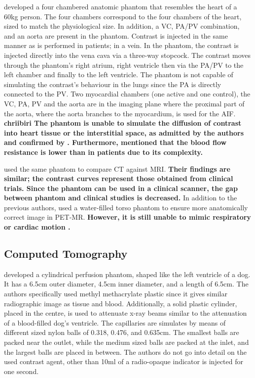 \cite{chiribiri2013perfusion} developed a four chambered anatomic phantom that resembles the heart of a 60kg person. The four chambers correspond to the four chambers of the heart, sized to match the physiological size. In addition, a \ac{VC}, \ac{PA}/\ac{PV} combination, and an aorta are present in the phantom. Contrast is injected in the same manner as is performed in patients; in a vein. In the phantom, the contrast is injected directly into the vena cava via a three-way stopcock. The contrast moves through the phantom's right atrium, right ventricle then via the \ac{PA}/\ac{PV} to the left chamber and finally to the left ventricle. The phantom is not capable of simulating the contrast's behaviour in the lungs since the \ac{PA} is directly connected to the \ac{PV}. Two myocardial chambers (one active and one control), the \ac{VC}, \ac{PA}, \ac{PV} and the aorta are in the imaging plane where the proximal part of the aorta, where the aorta branches to the myocardium, is used for the \ac{AIF}. \textbf{chriibiri The phantom is unable to simulate the diffusion of contrast into heart tissue or the interstitial space, as admitted by the authors and confirmed by \cite{otton2013direct, o2017effect}. Furthermore, \cite{chiribiri2013perfusion} mentioned that the blood flow resistance is lower than in patients due to its complexity.}

\cite{otton2013direct} used the same phantom to compare \ac{CT} against \ac{MRI}.\textbf{ Their findings are similar; the contrast curves represent those obtained from clinical trials. Since the phantom can be used in a clinical  scanner, the gap between phantom and clinical studies is decreased.} In addition to the previous authors, \cite{o2017effect} used a water-filled torso phantom to ensure more anatomically correct image in \ac{PET-MR}. \textbf{However, it is still unable to mimic respiratory or cardiac motion \citep{o2017feasibility}.} 

\subsection{Computed Tomography}
\cite{teslow1991x} developed a cylindrical perfusion phantom, shaped like the left ventricle of a dog. It has a 6.5cm outer diameter, 4.5cm inner diameter, and a length of 6.5cm. The authors specifically used methyl methacrylate plastic since it gives similar radiographic image as tissue and blood. Additionally, a solid plastic cylinder, placed in the centre, is used to attenuate x-ray beams similar to the attenuation of a blood-filled dog's ventricle. The capillaries are simulates by means of different sized nylon balls of 0.318, 0.476, and 0.635cm. The smallest balls are packed near the outlet, while the medium sized balls are packed at the inlet, and the largest balls are placed in between. The authors do not go into detail on the used contrast agent, other than  10ml of a radio-opaque indicator is injected for one second.

